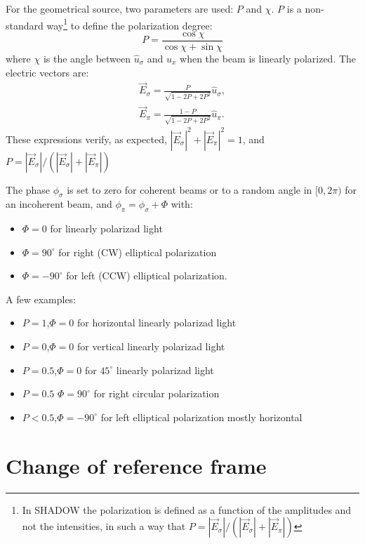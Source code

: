 \documentclass{iucr}
\begin{document}
For the geometrical source, two parameters are used: $P$ and $\chi$.  
$P$ is a non-standard way\footnote{In SHADOW the polarization is defined as a function of the amplitudes and not the intensities, in such a way that $P=|\vec{E}_\sigma|/(|\vec{E}_\sigma|+|\vec{E}_\pi|)$} to define the polarization degree:
\begin{equation}
   P = \frac{\cos \chi}{\cos \chi + \sin \chi}
\end{equation}
where $\chi$ is the angle between $\hat{u}_\sigma$ and $\hat{u}_x$ when the beam is linearly polarized. 
The electric vectors are: 
\begin{eqnarray}
   \vec{E}_\sigma = \frac{P}{\sqrt{1-2 P+ 2 P^2}} \hat{u}_\sigma, \nonumber \\
   \vec{E}_\pi    = \frac{1-P}{\sqrt{1-2 P+ 2 P^2}} \hat{u}_\pi.
\end{eqnarray}
These expressions verify, as expected,  $|\vec{E}_\sigma|^2 + |\vec{E}_\pi|^2 = 1$, and $P=|\vec{E}_\sigma|/(|\vec{E}_\sigma|+|\vec{E}_\pi|)$

The phase $\phi_\sigma$ is set to zero for coherent beams or to a random angle in $[0,2\pi)$ for an incoherent beam, and
$\phi_\pi=\phi_\sigma+\Phi$ with: 
\begin{itemize}
 \item $\Phi=0$ for linearly polarizad light 
 \item $\Phi=90^{\circ}$ for right (CW) elliptical polarization
 \item $\Phi=-90^{\circ}$ for left (CCW) elliptical polarization.
\end{itemize}
A few examples: 
\begin{itemize}
 \item $P=1$,$\Phi=0$ for horizontal linearly polarizad light 
 \item $P=0$,$\Phi=0$ for vertical linearly polarizad light
 \item $P=0.5$,$\Phi=0$ for $45^\circ$ linearly polarizad light
 \item $P=0.5$ $\Phi=90^{\circ}$ for right circular polarization
 \item $P<0.5$,$\Phi=-90^{\circ}$ for left elliptical polarization mostly horizontal
\end{itemize}

\section{Change of reference frame}
\label{sec:change_frame}
\end{document}
